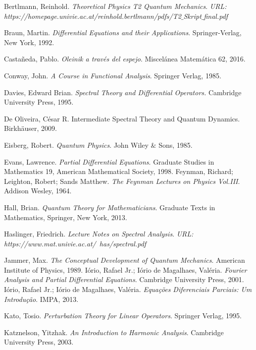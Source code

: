 \documentclass[12pt]{article}
\theoremstyle{definition}
\begin{document}
\newpage
\begin{thebibliography}{a}


Bertlmann, Reinhold.
\textit{Theoretical Physics T2 Quantum Mechanics}.
\textit{URL: https://homepage.univie.ac.at/reinhold.bertlmann/pdfs/T2$\_$Skript$\_$final.pdf}

Braun, Martin.
\textit{Differential Equations and their Applications}.
Springer-Verlag, New York, 1992.

Castañeda, Pablo.
\textit{Oleinik a través del espejo}.
Miscelánea Matemática 62, 2016.

Conway, John.
\textit{A Course in Functional Analysis}.
Springer Verlag, 1985.

Davies, Edward Brian.
\textit{Spectral Theory and Differential Operators.}
Cambridge University Press, 1995.

De Oliveira, César R. Intermediate Spectral Theory and Quantum Dynamics. Birkhäuser, 2009.

Eisberg, Robert. 
\textit{Quantum Physics}.
John Wiley $\&$ Sons, 1985. 

Evans, Lawrence.
\textit{Partial Differential Equations}.
Graduate Studies in Mathematics 19, American Mathematical Society, 1998.
Feynman, Richard; Leighton, Robert; Sands Matthew.
\textit{The Feynman Lectures on Physics Vol.III}.
Addison Wesley, 1964.

Hall, Brian. 
\textit{Quantum Theory for Mathematicians}. Graduate Texts in Mathematics,
Springer, New York, 2013.

Haslinger, Friedrich.
\textit{Lecture Notes on Spectral Analysis}.
\textit{URL: https://www.mat.univie.ac.at/~has/spectral.pdf}

Jammer, Max.
\textit{The Conceptual Development of Quantum Mechanics}.
American Institute of Physics, 1989.
Iório, Rafael Jr.; Iório  de Magalhaes, Valéria.
\textit{Fourier Analysis and Partial Differential Equations}.
Cambridge University Press, 2001.
 Iório, Rafael Jr.; Iório  de Magalhaes, Valéria.
\textit{Equa\c{c}\~oes Diferenciais Parciais: Um Introdu\c{c}\~ao}.
IMPA, 2013.

Kato, Tosio.
\textit{Perturbation Theory for Linear Operators}.
Springer Verlag, 1995.

Katznelson, Yitzhak.
\textit{An Introduction to Harmonic Analysis}.
Cambridge University Press, 2003.


\end{thebibliography}
\end{document}
